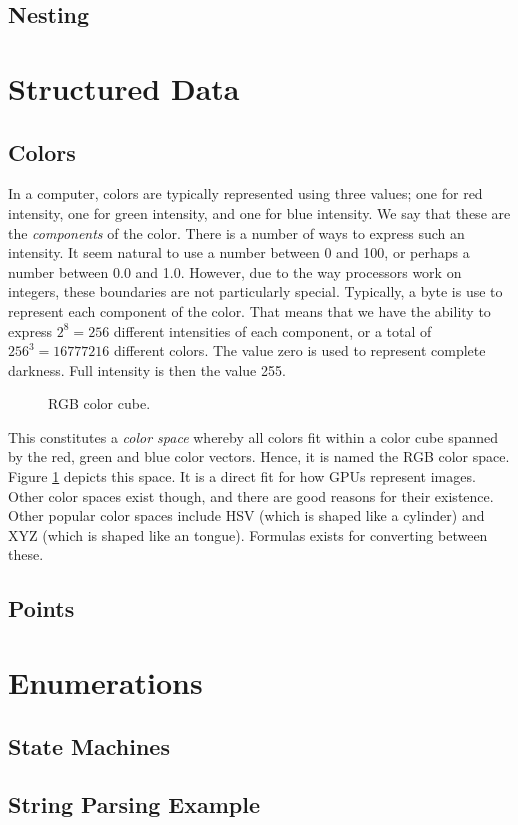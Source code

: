 \subsection{Nesting}

\section{Structured Data}

\subsection{Colors}

In a computer, colors are typically represented using three values; one for red intensity, one for green intensity, and one for blue intensity. We say that these are the \textsl{components} of the color. There is a number of ways to express such an intensity. It seem natural to use a number between 0 and 100, or perhaps a number between 0.0 and 1.0. However, due to the way processors work on integers, these boundaries are not particularly special. Typically, a byte is use to represent each component of the color. That means that we have the ability to express $2^8=256$ different intensities of each component, or a total of $256^3=16777216$ different colors. The value zero is used to represent complete darkness. Full intensity is then the value 255.

\begin{figure}[tbp]
  
  \caption{RGB color cube.}
  \label{fig:primdata:struct:color}
\end{figure}

This constitutes a \textsl{color space} whereby all colors fit within a color cube spanned by the red, green and blue color vectors. Hence, it is named the RGB color space. Figure \ref{fig:primdata:struct:color} depicts this space. It is a direct fit for how GPUs represent images. Other color spaces exist though, and there are good reasons for their existence. Other popular color spaces include HSV (which is shaped like a cylinder) and XYZ (which is shaped like an tongue). Formulas exists for converting between these.

\subsection{Points}

\section{Enumerations}

\subsection{State Machines}

\subsection{String Parsing Example}

